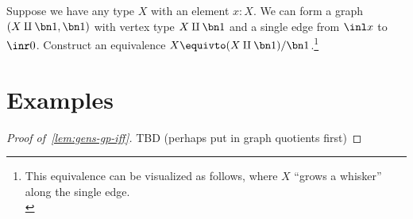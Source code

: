 \begin{xca}\label{xca:graph-quotient-whisker}
  Suppose we have any type $X$ with an element $x:X$.
  We can form a graph $(X\amalg\bn 1,\bn 1)$ with vertex type $X\amalg\bn 1$
  and a single edge from $\inl x$ to $\inr 0$.
  Construct an equivalence $X \equivto (X\amalg\bn 1)/\bn 1$.\footnote{%
    This equivalence can be visualized as follows, where $X$ ``grows a whisker''
    along the single edge.\\
    }
\end{xca}
\section{Examples}
\label{sec:fg-examples}



\begin{proof}[Proof of~\cref{lem:gens-gp-iff}]
  TBD (perhaps put in graph quotients first)
\end{proof}


